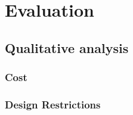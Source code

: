 \chapter{Evaluation}
\label{chap:eval}


\section{Qualitative analysis}
\subsection{Cost}







\subsection{Design Restrictions} %



